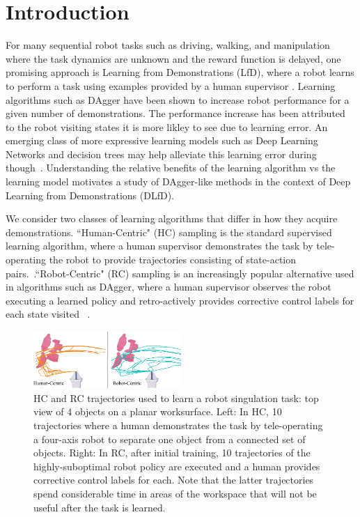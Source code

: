 \documentclass[10pt, conference]{ieeeconf}      %
\begin{document}
\section{Introduction} 
For many sequential robot tasks such as driving, walking, and manipulation where the task dynamics are unknown and the reward function is delayed, one promising approach is Learning from Demonstrations (LfD), where a robot learns to perform a task using examples provided by a human supervisor \cite{pomerleau1989alvinn,abbeel2008apprenticeship,argall2009survey,ross2010reduction,laskeyshiv}.  Learning algorithms such as DAgger have been shown to increase robot performance for a given number of demonstrations. The performance increase has been attributed to the robot visiting states it is more likley to see due to learning error.  An emerging class of more expressive learning models such as Deep Learning Networks and decision trees may help alleviate this learning error during though~\cite{levine2015end}.  Understanding the relative benefits of the learning algorithm vs the learning model motivates a study of DAgger-like methods in the context of Deep Learning from Demonstrations (DLfD).

We consider two classes of learning algorithms that differ in how they acquire demonstrations. ``Human-Centric" (HC) sampling is the standard supervised learning algorithm, where a human supervisor demonstrates the task by tele-operating the robot to provide trajectories consisting of state-action pairs.~\cite{argall2009survey}.``Robot-Centric" (RC) sampling is an increasingly popular alternative used in algorithms such as DAgger, where a human supervisor observes the robot executing a learned policy and retro-actively provides corrective control labels for each state visited ~\cite{ross2010efficient,ross2010reduction,laskeyrobot,laskeyshiv,he2012imitation}.  



\begin{figure}
\center
\includegraphics[width=0.5\textwidth]{f_figs/teaser.eps}
\caption{
    \footnotesize
HC and RC trajectories used to learn a robot singulation task: top view of 4 objects on a planar worksurface.  Left: In HC, 10 trajectories where a human demonstrates the task by tele-operating a four-axis robot to separate one object from a connected set of objects. Right: In RC, after initial training, 10 trajectories of the highly-suboptimal robot policy are executed and a  human provides corrective control labels for each.  Note that the latter trajectories spend considerable time in areas of the workspace that will not be useful after the task is learned.}
\vspace*{-20pt}
\label{fig:teaser}
\end{figure}
\end{document}
